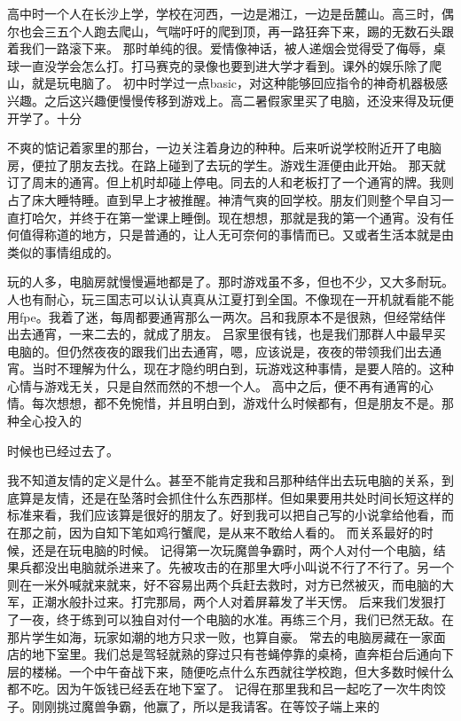 \documentclass{article}
\begin{document}
高中时一个人在长沙上学，学校在河西，一边是湘江，一边是岳麓山。高三时，偶尔也会三五个人跑去爬山，气喘吁吁的爬到顶，再一路狂奔下来，踢的无数石头跟着我们一路滚下来。 
那时单纯的很。爱情像神话，被人递烟会觉得受了侮辱，桌球一直没学会怎么打。打马赛克的录像也要到进大学才看到。课外的娱乐除了爬山，就是玩电脑了。 
初中时学过一点basic，对这种能够回应指令的神奇机器极感兴趣。之后这兴趣便慢慢传移到游戏上。高二暑假家里买了电脑，还没来得及玩便开学了。十分

\newpage 

不爽的惦记着家里的那台，一边关注着身边的种种。后来听说学校附近开了电脑房，便拉了朋友去找。在路上碰到了去玩的学生。游戏生涯便由此开始。 
那天就订了周末的通宵。但上机时却碰上停电。同去的人和老板打了一个通宵的牌。我则占了床大睡特睡。直到早上才被推醒。神清气爽的回学校。朋友们则整个早自习一直打哈欠，并终于在第一堂课上睡倒。现在想想，那就是我的第一个通宵。没有任何值得称道的地方，只是普通的，让人无可奈何的事情而已。又或者生活本就是由类似的事情组成的。 

玩的人多，电脑房就慢慢遍地都是了。那时游戏虽不多，但也不少，又大多耐玩。人也有耐心，玩三国志可以认认真真从江夏打到全国。不像现在一开机就看能不能用fpe。我着了迷，每周都要通宵那么一两次。吕和我原本不是很熟，但经常结伴出去通宵，一来二去的，就成了朋友。 
吕家里很有钱，也是我们那群人中最早买电脑的。但仍然夜夜的跟我们出去通宵，嗯，应该说是，夜夜的带领我们出去通宵。当时不理解为什么，现在才隐约明白到，玩游戏这种事情，是要人陪的。这种心情与游戏无关，只是自然而然的不想一个人。 
高中之后，便不再有通宵的心情。每次想想，都不免惋惜，并且明白到，游戏什么时候都有，但是朋友不是。那种全心投入的

\newpage 

时候也已经过去了。 

我不知道友情的定义是什么。甚至不能肯定我和吕那种结伴出去玩电脑的关系，到底算是友情，还是在坠落时会抓住什么东西那样。但如果要用共处时间长短这样的标准来看，我们应该算是很好的朋友了。好到我可以把自己写的小说拿给他看，而在那之前，因为自知下笔如鸡行蟹爬，是从来不敢给人看的。 
而关系最好的时候，还是在玩电脑的时候。 
记得第一次玩魔兽争霸时，两个人对付一个电脑，结果兵都没出电脑就杀进来了。先被攻击的在那里大呼小叫说不行了不行了。另一个则在一米外喊就来就来，好不容易出两个兵赶去救时，对方已然被灭，而电脑的大军，正潮水般扑过来。打完那局，两个人对着屏幕发了半天愣。 
后来我们发狠打了一夜，终于练到可以独自对付一个电脑的水准。再练三个月，我们已然无敌。在那片学生如海，玩家如潮的地方只求一败，也算自豪。 
常去的电脑房藏在一家面店的地下室里。我们总是驾轻就熟的穿过只有苍蝇停靠的桌椅，直奔柜台后通向下层的楼梯。一个中午奋战下来，随便吃点什么东西就往学校跑，但大多数时候什么都不吃。因为午饭钱已经丢在地下室了。 
记得在那里我和吕一起吃了一次牛肉饺子。刚刚挑过魔兽争霸，他赢了，所以是我请客。在等饺子端上来的
\end{document}
